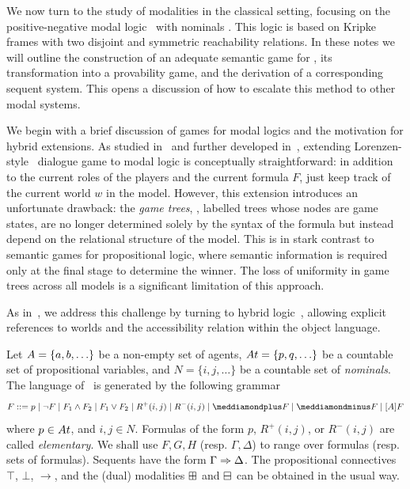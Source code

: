 
We now turn to the study of modalities in the classical setting, focusing on the positive-negative modal logic \PNL\ with nominals \cite{DBLP:journals/jolli/XiongA20,DBLP:journals/logcom/PedersenSA21}. This logic is based on Kripke frames with two disjoint and symmetric reachability relations. In these notes we will outline the construction of an adequate semantic game for \PNL, its transformation into a provability game, and the derivation of a corresponding sequent system. This opens a discussion of how to escalate this method to other modal systems.

We begin with a brief discussion of games for modal logics and the motivation for hybrid extensions. As studied in~\cite{blackburn-synthese} and further developed in~\cite{Robert-PhD}, extending Lorenzen-style~\cite{Lorenzen1978-LORDLJ-2} dialogue game to modal logic is conceptually straightforward: in addition to the current roles of the players and the current formula $F$, just keep track of the current world $w$ in the model. However, this extension introduces an unfortunate drawback: the {\em game trees}, \ie, labelled trees whose nodes are game states, are no longer determined solely by the syntax of the formula but instead depend on the relational structure of the model. This is in stark contrast to semantic games for propositional logic, where semantic information is required only at the final stage to determine the winner. The loss of uniformity in game trees across all models is a significant limitation of this approach.

As in~\cite{blackburn-synthese,DBLP:conf/wollic/Freiman21}, we address this challenge by turning to hybrid logic~\cite{DBLP:journals/jolli/BlackburnS95,DBLP:journals/japll/BraunerP06,brauner2010hybrid}, allowing explicit references to worlds and the accessibility relation within the object language. 

Let $\A=\{\ag,\b,\ldots\}$ be a non-empty set of agents,
$\At=\{p,q,\ldots\}$ be a countable set of propositional variables, and $N=\{i,j,\ldots\}$ be a countable set of \emph{nominals}. The language of \PNL~is generated by the following grammar
$$F  ::= p  \mid \neg F  \mid F_1  \wedge F_2  \mid F_1  \vee F_2  \mid  R^+(i,j)\mid R^-(i,j) \mid  \dplus F  \mid \dminus F \mid [A]F $$
where $p\in \At$, and $i,j\in N$.  Formulas of the form $p$, $R^+(i,j)$, or $R^-(i,j)$ are called \emph{elementary}. We shall use $F,G,H$ (resp. $\Gamma,\Delta$) to range over formulas (resp. sets of formulas). Sequents have the form $\Gamma\Rightarrow\Delta$.
The propositional connectives $\top$, $\bot$, $\to$, and the (dual)  modalities $\boxplus$ and $\boxminus$ can be obtained in the usual way. 

